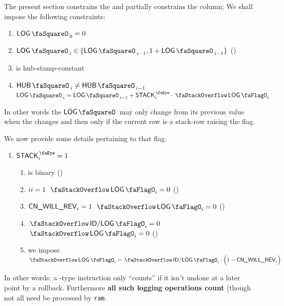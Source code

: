 The present section constrains the \logStamp{} and partially constrains the \stackLogFlag{} column;
We shall impose the following constraints:
\begin{enumerate}
	\item $\logStamp_{0} = 0$
	\item $\logStamp_{i} \in \{ \logStamp_{i - 1}, 1 + \logStamp_{i - 1} \}$ (\trash)
	\item \logStamp{} is hub-stamp-constant
	\item \If $\hubStamp_{i} \neq \hubStamp_{i - 1}$ \Then $\logStamp_{i} = \logStamp_{i - 1} + \peekStack_{i} \cdot \stackLogFlag_{i}$
\end{enumerate}
In other words the $\logStamp$ may only change from its previous value when the \hubStamp{} changes and then only if the current row is a stack-row raising the \stackLogFlag{} flag.

We now provide some details pertaining to that flag:
\begin{enumerate}[resume]
	\item \If $\peekStack_{i} = 1$ \Then
		\begin{enumerate}
			\item \stackLogFlag{} is binary (\trash)
			\item \If $\xAhoy_{i}           = 1$ \Then $\stackLogFlag_{i} = 0$ \quad (\trash)
			\item \If $\textsf{CN}\textsf{\_WILL\_REV}_{i}       = 1$ \Then $\stackLogFlag_{i} = 0$ \quad (\trash)
			\item \If $\stackDecLogFlag_{i} = 0$ \Then $\stackLogFlag_{i} = 0$ \quad (\trash)
			\item we impose $\stackLogFlag_{i} = \stackDecLogFlag_{i} \cdot \Big( 1 - \cnWillRev_{i} \Big)$
		\end{enumerate}
\end{enumerate}
\saNote{} 
In other words: a -type instruction only ``counts'' if it isn't undone at a later point by a rollback.
Furthermore \textbf{all such logging operations count} (though not all need be processed by \texttt{ram}.

